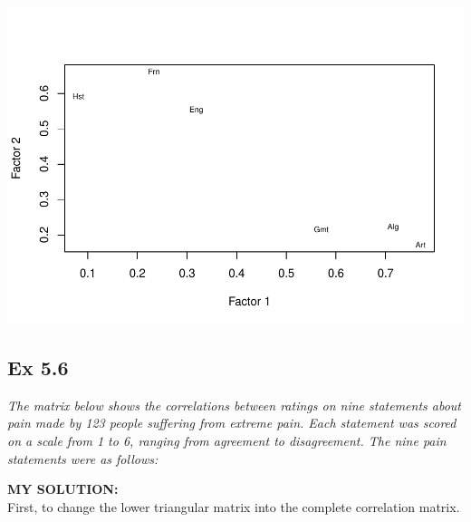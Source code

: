 \documentclass[
]{article}
\begin{document}
\includegraphics{HUDM6122-Homework_05-Chenguang-Pan_files/figure-latex/unnamed-chunk-12-1.pdf}

\hypertarget{ex-5.6}{%
\subsection{Ex 5.6}\label{ex-5.6}}

\emph{The matrix below shows the correlations between ratings on nine
statements about pain made by 123 people suffering from extreme pain.
Each statement was scored on a scale from 1 to 6, ranging from agreement
to disagreement. The nine pain statements were as follows:}

\textbf{MY SOLUTION:}\\
First, to change the lower triangular matrix into the complete
correlation matrix.
\end{document}
